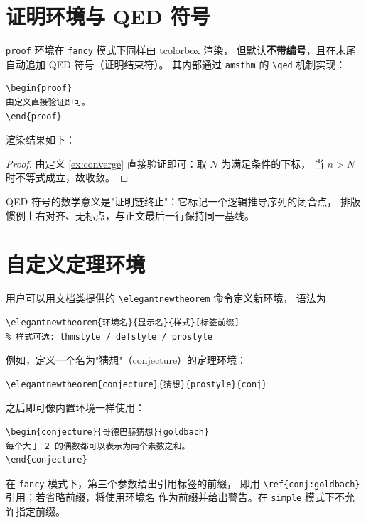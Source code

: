 \section{证明环境与 QED 符号}

\verb|proof| 环境在 \texttt{fancy} 模式下同样由 tcolorbox 渲染，
但默认\textbf{不带编号}，且在末尾自动追加 QED 符号（证明结束符）。
其内部通过 \texttt{amsthm} 的 \verb|\qed| 机制实现：

\begin{lstlisting}
\begin{proof}
由定义直接验证即可。
\end{proof}
\end{lstlisting}

渲染结果如下：

\begin{proof}
由定义 \ref{ex:converge} 直接验证即可：取 $N$ 为满足条件的下标，
当 $n>N$ 时不等式成立，故收敛。
\end{proof}

QED 符号的数学意义是"证明链终止"：它标记一个逻辑推导序列的闭合点，
排版惯例上右对齐、无标点，与正文最后一行保持同一基线。

\section{自定义定理环境}

用户可以用文档类提供的 \verb|\elegantnewtheorem| 命令定义新环境，
语法为
\begin{lstlisting}
\elegantnewtheorem{环境名}{显示名}{样式}[标签前缀]
% 样式可选: thmstyle / defstyle / prostyle
\end{lstlisting}

例如，定义一个名为"猜想"（conjecture）的定理环境：

\begin{lstlisting}
\elegantnewtheorem{conjecture}{猜想}{prostyle}{conj}
\end{lstlisting}

之后即可像内置环境一样使用：
\begin{lstlisting}
\begin{conjecture}{哥德巴赫猜想}{goldbach}
每个大于 2 的偶数都可以表示为两个素数之和。
\end{conjecture}
\end{lstlisting}

\begin{remark}
在 \texttt{fancy} 模式下，第三个参数给出引用标签的前缀，
即用 \verb|\ref{conj:goldbach}| 引用；若省略前缀，将使用环境名
作为前缀并给出警告。在 \texttt{simple} 模式下不允许指定前缀。
\end{remark}

